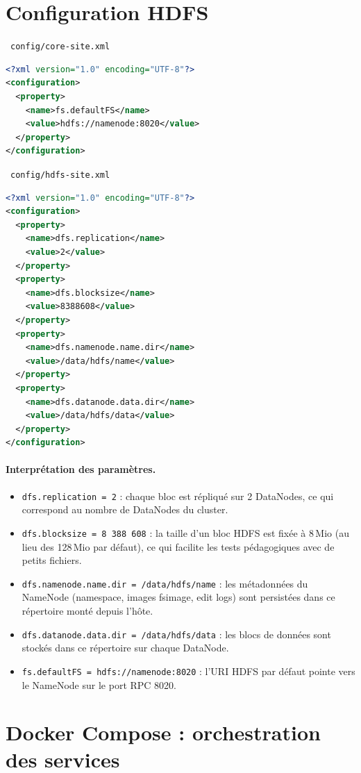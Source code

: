 \documentclass[11pt,a4paper]{article}
\newcommand{\fichier}[1]{%
  \par\medskip\noindent
  {\sffamily\small\bfseries\color{ENIADNavy}%
   \colorbox{ENIADLightBlue}{\strut\ \texttt{#1}\ }}%
  \par\nopagebreak\vspace{-2pt}}
\begin{document}
\section{Configuration HDFS}

\fichier{config/core-site.xml}
\begin{lstlisting}[language=XML]
<?xml version="1.0" encoding="UTF-8"?>
<configuration>
  <property>
    <name>fs.defaultFS</name>
    <value>hdfs://namenode:8020</value>
  </property>
</configuration>
\end{lstlisting}

\fichier{config/hdfs-site.xml}
\begin{lstlisting}[language=XML]
<?xml version="1.0" encoding="UTF-8"?>
<configuration>
  <property>
    <name>dfs.replication</name>
    <value>2</value>
  </property>
  <property>
    <name>dfs.blocksize</name>
    <value>8388608</value>
  </property>
  <property>
    <name>dfs.namenode.name.dir</name>
    <value>/data/hdfs/name</value>
  </property>
  <property>
    <name>dfs.datanode.data.dir</name>
    <value>/data/hdfs/data</value>
  </property>
</configuration>
\end{lstlisting}

\paragraph{Interprétation des paramètres.}
\begin{itemize}
  \item \texttt{dfs.replication = 2} : chaque bloc est répliqué sur 2 DataNodes, ce qui correspond au nombre de DataNodes du cluster.
  \item \texttt{dfs.blocksize = 8\,388\,608} : la taille d'un bloc HDFS est fixée à 8\,Mio (au lieu des 128\,Mio par défaut), ce qui facilite les tests pédagogiques avec de petits fichiers.
  \item \texttt{dfs.namenode.name.dir = /data/hdfs/name} : les métadonnées du NameNode (namespace, images fsimage, edit logs) sont persistées dans ce répertoire monté depuis l'hôte.
  \item \texttt{dfs.datanode.data.dir = /data/hdfs/data} : les blocs de données sont stockés dans ce répertoire sur chaque DataNode.
  \item \texttt{fs.defaultFS = hdfs://namenode:8020} : l'URI HDFS par défaut pointe vers le NameNode sur le port RPC 8020.
\end{itemize}


\section{Docker Compose : orchestration des services}
\end{document}
